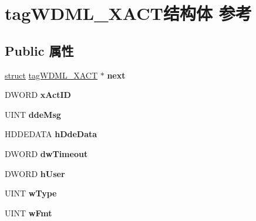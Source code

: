 \hypertarget{structtag_w_d_m_l___x_a_c_t}{}\section{tag\+W\+D\+M\+L\+\_\+\+X\+A\+C\+T结构体 参考}
\label{structtag_w_d_m_l___x_a_c_t}
\subsection*{Public 属性}
\begin{DoxyCompactItemize}
\item 
\mbox{\label{structtag_w_d_m_l___x_a_c_t_a29096b64eea235dcccac47bbb569b70f}} 
\hyperlink{interfacestruct}{struct} \hyperlink{structtag_w_d_m_l___x_a_c_t}{tag\+W\+D\+M\+L\+\_\+\+X\+A\+CT} $\ast$ {\bfseries next}
\item 
\mbox{\label{structtag_w_d_m_l___x_a_c_t_a116a797abcacc00aa8fef1478b56eded}} 
D\+W\+O\+RD {\bfseries x\+Act\+ID}
\item 
\mbox{\label{structtag_w_d_m_l___x_a_c_t_a66827d0e603c14de5c6602ad7121f717}} 
U\+I\+NT {\bfseries dde\+Msg}
\item 
\mbox{\label{structtag_w_d_m_l___x_a_c_t_a15074215d26c2e675ebafeb02ffec6a5}} 
H\+D\+D\+E\+D\+A\+TA {\bfseries h\+Dde\+Data}
\item 
\mbox{\label{structtag_w_d_m_l___x_a_c_t_a43eff2b571f65ab4d20586e929a3913e}} 
D\+W\+O\+RD {\bfseries dw\+Timeout}
\item 
\mbox{\label{structtag_w_d_m_l___x_a_c_t_a5b740317659ab9232a86e74f2750135e}} 
D\+W\+O\+RD {\bfseries h\+User}
\item 
\mbox{\label{structtag_w_d_m_l___x_a_c_t_a5482e0cb11e9bb2b5494c68bead49e51}} 
U\+I\+NT {\bfseries w\+Type}
\item 
\mbox{\label{structtag_w_d_m_l___x_a_c_t_a6773a4c528b334be2dd53979824ad656}} 
U\+I\+NT {\bfseries w\+Fmt}
\item 

\end{DoxyCompactItemize}
